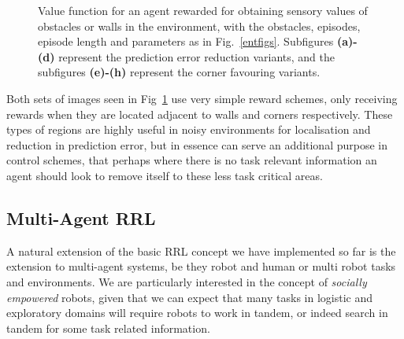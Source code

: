 \documentclass{article}
\begin{document}
\begin{figure}[ht]
\caption{Value function for an agent rewarded for obtaining sensory values of obstacles or walls in the environment, with the obstacles, episodes, episode length and parameters as in Fig.~\ref{entfigs}. Subfigures \textbf{(a)-(d)} represent the prediction error reduction variants, and the subfigures \textbf{(e)-(h)} represent the corner favouring variants.\label{othervariants}}
\end{figure}

Both sets of images seen in Fig~\ref{othervariants} use very simple reward schemes, only receiving rewards when they are located adjacent to walls and corners respectively. These types of regions are highly useful in noisy environments for localisation and reduction in prediction error, but in essence can serve an additional purpose in control schemes, that perhaps where there is no task relevant information an agent should look to remove itself to these less task critical areas. %

\subsection{Multi-Agent RRL}
\label{sharedspace}
A natural extension of the basic RRL concept we have implemented so far is the extension to multi-agent systems, be they robot and human or multi robot tasks and environments. We are particularly interested in the concept of \emph{socially empowered} robots, given that we can expect that many tasks in logistic and exploratory domains will require robots to work in tandem, or indeed search in tandem for some task related information.
\end{document}
